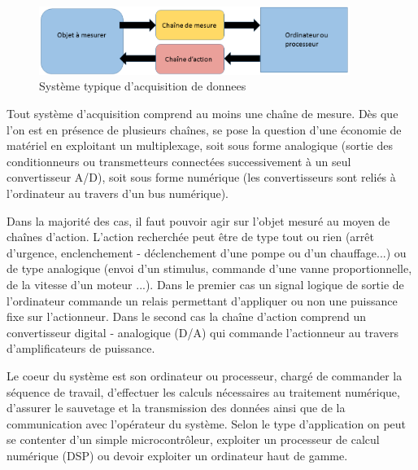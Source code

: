 \begin{figure}[h]
\centering
\includegraphics[width=0.9\textwidth]{assets/figures/fig_TechMes_CBD_SysTypdAcquDeDonnees.png}
\caption{Système typique d'acquisition de donnees}
\label{fig:SystemeTypiquedAcquisitionDeDonnees}
\end{figure}

Tout système d'acquisition comprend au moins une chaîne de mesure. Dès que l'on est en présence de plusieurs chaînes, se pose la question d'une économie de matériel en exploitant un multiplexage, soit sous forme analogique (sortie des conditionneurs ou transmetteurs connectées successivement à un seul convertisseur A/D), soit sous forme numérique (les convertisseurs sont reliés à l'ordinateur au travers d'un bus numérique).

Dans la majorité des cas, il faut pouvoir agir sur l'objet mesuré au moyen de chaînes d'action. L'action recherchée peut être de type tout ou rien (arrêt d'urgence, enclenchement - déclenchement d'une pompe ou d'un chauffage...) ou de type analogique (envoi d'un stimulus, commande d'une vanne proportionnelle, de la vitesse d'un moteur ...). Dans le premier cas un signal logique de sortie de l'ordinateur commande un relais permettant d'appliquer ou non une puissance fixe sur l'actionneur. Dans le second cas la chaîne d'action comprend un convertisseur digital - analogique (D/A) qui commande l'actionneur au travers d'amplificateurs de puissance.

Le coeur du système est son ordinateur ou processeur, chargé de commander la séquence de travail, d'effectuer les calculs nécessaires au traitement numérique, d'assurer le sauvetage et la transmission des données ainsi que de la communication avec l'opérateur du système. Selon le type d'application on peut se contenter d'un simple microcontrôleur, exploiter un processeur de calcul numérique (DSP) ou devoir exploiter un ordinateur haut de gamme.

